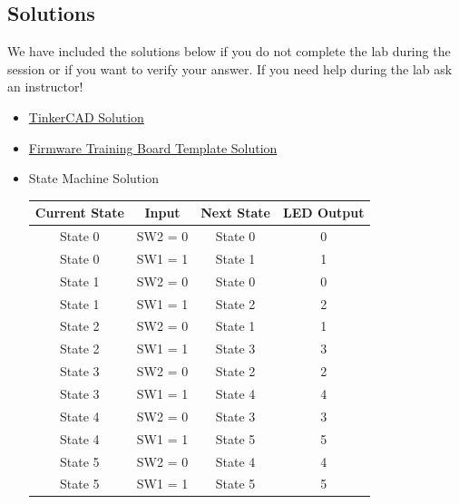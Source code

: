 \documentclass{article}
\begin{document}
    \subsection{Solutions}
    We have included the solutions below if you do not complete the lab during the session or if you want to verify your answer. If you need help during the lab ask an instructor!
\begin{itemize}
    \item \href{https://www.tinkercad.com/things/cGKh5f8nkDv}{TinkerCAD Solution}
    \item \href{https://github.com/RoboJackets/firmware-training/blob/master/code/Week2/Week_2_Solution/Week_2_Solution.ino}{Firmware Training Board Template Solution}
    \item State Machine Solution
    \begin{center}
            \begin{tabular}{|c|c|c|c|}
                \hline
                Current State & Input & Next State & LED Output \\
                \hline
                State 0 & SW2 = 0 & State 0 & 0 \\ 
                State 0 & SW1 = 1 & State 1 & 1 \\
                \hline
                State 1 & SW2 = 0 & State 0 & 0 \\
                State 1 & SW1 = 1 & State 2 & 2 \\
                \hline
                State 2 & SW2 = 0 & State 1 & 1 \\
                State 2 & SW1 = 1 & State 3 & 3 \\
                \hline
                State 3 & SW2 = 0 & State 2 & 2 \\
                State 3 & SW1 = 1 & State 4 & 4 \\
                \hline
                State 4 & SW2 = 0 & State 3 & 3 \\
                State 4 & SW1 = 1 & State 5 & 5 \\
                \hline
                State 5 & SW2 = 0 & State 4 & 4 \\
                State 5 & SW1 = 1 & State 5 & 5 \\
                \hline
            \end{tabular}
        \end{center}
        
        \begin{center}
\end{center}
\end{itemize}
\end{document}
